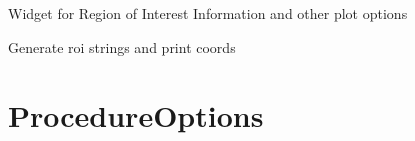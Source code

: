 \documentclass[letterpaper,10pt,english]{sphinxmanual}
\begin{document}
\begin{fulllineitems}
\label{PlotOptions:Optionswidgets.PlotOptions}
Widget for Region of Interest Information and other plot options

\begin{fulllineitems}
\label{PlotOptions:Optionswidgets.PlotOptions.set_roi}
Generate roi strings and print coords

\end{fulllineitems}


\end{fulllineitems}



\section{ProcedureOptions}
\label{ProcedureOptions:procedureoptions}\label{ProcedureOptions::doc}
\end{document}
